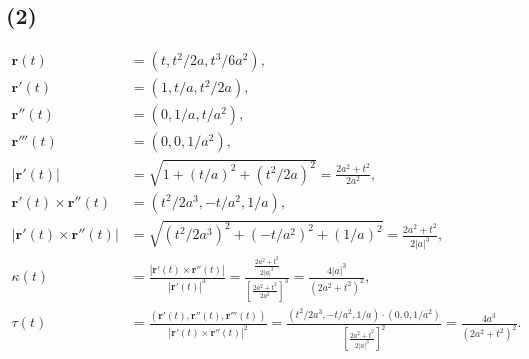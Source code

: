 \documentclass[11pt,a4paper]{article}
\begin{document}
\subsection*{(2)}
\begin{align*}
  \mathbf{r}(t)                         & =(t,t^2/2a,t^3/6a^2),                           \\
  \mathbf{r}'(t)                        & =(1,t/a,t^2/2a),                                \\
  \mathbf{r}''(t)                       & =(0,1/a,t/a^2),                                 \\
  \mathbf{r}'''(t)                      & =(0,0,1/a^2),                                   \\
  |\mathbf{r}'(t)|                      & =\sqrt{1+(t/a)^2+(t^2/2a)^2}
  =\frac{2a^2+t^2}{2a^2},                                                                 \\
  \mathbf{r}'(t)\times\mathbf{r}''(t)   &
  =(t^2/2a^3,-t/a^2,1/a),                                                                 \\
  |\mathbf{r}'(t)\times\mathbf{r}''(t)| & =\sqrt{(t^2/2a^3)^2+(-t/a^2)^2+(1/a)^2}
  =\frac{2a^2+t^2}{2|a|^3},                                                               \\
  \kappa(t)                             &
  =\frac{|\mathbf{r}'(t)\times\mathbf{r}''(t)|}{|\mathbf{r}'(t)|^3}
  =\frac{\frac{2a^2+t^2}{2|a|^3}}{[\frac{2a^2+t^2}{2a^2}]^3}=\frac{4|a|^3}{(2a^2+t^2)^2}, \\
  \tau(t)                               &
  =\frac{(\mathbf{r}'(t),\mathbf{r}''(t),\mathbf{r}'''(t))}{|\mathbf{r}'(t)\times\mathbf{r}''(t)|^2}=\frac{(t^2/2a^3,-t/a^2,1/a)\cdot(0,0,1/a^2)}{[\frac{2a^2+t^2}{2|a|^3}]^2}=\frac{4a^3}{(2a^2+t^2)^2}.
\end{align*}
\end{document}
